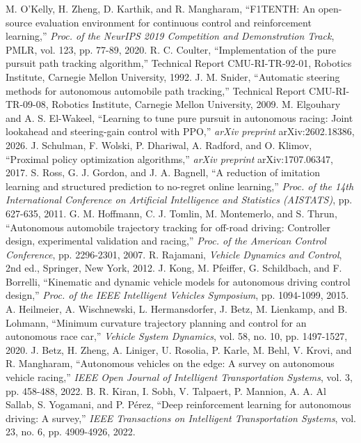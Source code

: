 \documentclass{IJCAS}
\begin{document}
\begin{reference}
 M. O'Kelly, H. Zheng, D. Karthik, and R. Mangharam, ``F1TENTH: An open-source evaluation environment for continuous control and reinforcement learning,'' \textit{Proc. of the NeurIPS 2019 Competition and Demonstration Track}, PMLR, vol. 123, pp. 77-89, 2020.
 R. C. Coulter, ``Implementation of the pure pursuit path tracking algorithm,'' Technical Report CMU-RI-TR-92-01, Robotics Institute, Carnegie Mellon University, 1992.
 J. M. Snider, ``Automatic steering methods for autonomous automobile path tracking,'' Technical Report CMU-RI-TR-09-08, Robotics Institute, Carnegie Mellon University, 2009.
 M. Elgouhary and A. S. El-Wakeel, ``Learning to tune pure pursuit in autonomous racing: Joint lookahead and steering-gain control with PPO,'' \textit{arXiv preprint} arXiv:2602.18386, 2026.
 J. Schulman, F. Wolski, P. Dhariwal, A. Radford, and O. Klimov, ``Proximal policy optimization algorithms,'' \textit{arXiv preprint} arXiv:1707.06347, 2017.
 S. Ross, G. J. Gordon, and J. A. Bagnell, ``A reduction of imitation learning and structured prediction to no-regret online learning,'' \textit{Proc. of the 14th International Conference on Artificial Intelligence and Statistics (AISTATS)}, pp. 627-635, 2011.
 G. M. Hoffmann, C. J. Tomlin, M. Montemerlo, and S. Thrun, ``Autonomous automobile trajectory tracking for off-road driving: Controller design, experimental validation and racing,'' \textit{Proc. of the American Control Conference}, pp. 2296-2301, 2007.
 R. Rajamani, \textit{Vehicle Dynamics and Control}, 2nd ed., Springer, New York, 2012.
 J. Kong, M. Pfeiffer, G. Schildbach, and F. Borrelli, ``Kinematic and dynamic vehicle models for autonomous driving control design,'' \textit{Proc. of the IEEE Intelligent Vehicles Symposium}, pp. 1094-1099, 2015.
 A. Heilmeier, A. Wischnewski, L. Hermansdorfer, J. Betz, M. Lienkamp, and B. Lohmann, ``Minimum curvature trajectory planning and control for an autonomous race car,'' \textit{Vehicle System Dynamics}, vol. 58, no. 10, pp. 1497-1527, 2020.
 J. Betz, H. Zheng, A. Liniger, U. Rosolia, P. Karle, M. Behl, V. Krovi, and R. Mangharam, ``Autonomous vehicles on the edge: A survey on autonomous vehicle racing,'' \textit{IEEE Open Journal of Intelligent Transportation Systems}, vol. 3, pp. 458-488, 2022.
 B. R. Kiran, I. Sobh, V. Talpaert, P. Mannion, A. A. Al Sallab, S. Yogamani, and P. P\'erez, ``Deep reinforcement learning for autonomous driving: A survey,'' \textit{IEEE Transactions on Intelligent Transportation Systems}, vol. 23, no. 6, pp. 4909-4926, 2022.

\end{reference}
\end{document}
